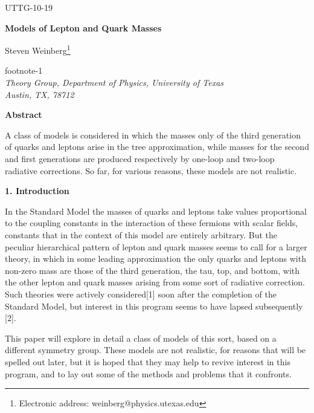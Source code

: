 \documentclass[12pt]{article}
\def\fnote#1#2{\begingroup\def\thefootnote{#1}\footnote{#2}\addtocounter
{footnote}{-1}\endgroup}
\begin{document}
\hfill{UTTG-10-19}


\vspace{20pt}


\begin{center}
{\large {\bf { Models of Lepton and Quark Masses}}}


\vspace{20pt}

Steven Weinberg\fnote{*}{Electronic address:
weinberg@physics.utexas.edu}\\
{\em Theory Group, Department of Physics, University of
Texas\\
Austin, TX, 78712}





\vspace{30pt}

\noindent
{\bf Abstract}
\end{center}


A class of models is considered in which the masses only of the third generation of quarks and leptons arise in the tree approximation, while masses for the second and first generations are produced respectively by one-loop and two-loop radiative corrections.  So far, for various reasons, these models are not realistic.





\vfill

\pagebreak

\begin{center}
{\bf 1. Introduction}
\end{center}


In the Standard Model the masses of quarks and leptons take values proportional to the coupling constants in the interaction of these fermions with scalar fields, constants that in the context of this model are entirely arbitrary.  But the peculiar hierarchical pattern of lepton and quark masses seems to call for a larger theory, in which in some leading approximation the only quarks and leptons with non-zero mass are those of the third generation, the tau, top, and bottom, with the other lepton and quark masses arising from some sort of radiative correction.  Such theories were actively considered[1]	  soon after the completion of the Standard Model, but interest in this program seems to have lapsed subsequently [2].  

This paper will explore in detail a class of models of this sort, based on a different symmetry group.  These models are not realistic, for reasons that will be spelled out later,  but it is hoped that they may help to revive interest in this program, and to lay out some of the methods and problems that it confronts.
\end{document}
